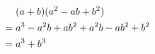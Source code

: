 \begin{align*}
    & (a+b)(a^2-ab+b^2) \notag \\
={} & a^3 - a^2b + ab^2 + a^2b
      - ab^2 + b^2 \notag \\
={} & a^3 + b^3 \label{eq:cubesum}
\end{align*}
